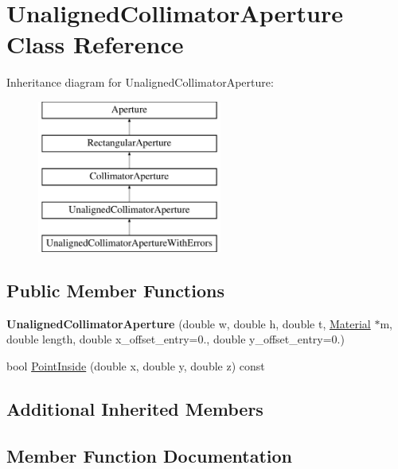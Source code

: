 \hypertarget{classUnalignedCollimatorAperture}{}\section{Unaligned\+Collimator\+Aperture Class Reference}
\label{classUnalignedCollimatorAperture}
Inheritance diagram for Unaligned\+Collimator\+Aperture\+:\begin{figure}[H]
\begin{center}
\leavevmode
\includegraphics[height=5.000000cm]{classUnalignedCollimatorAperture}
\end{center}
\end{figure}
\subsection*{Public Member Functions}
\begin{DoxyCompactItemize}
\item 
\mbox{\label{classUnalignedCollimatorAperture_a76d1e3e6e6385dc107100540514e33f9}} 
{\bfseries Unaligned\+Collimator\+Aperture} (double w, double h, double t, \hyperlink{classMaterial}{Material} $\ast$m, double length, double x\+\_\+offset\+\_\+entry=0., double y\+\_\+offset\+\_\+entry=0.)
\item 
bool \hyperlink{classUnalignedCollimatorAperture_af116c2ff1d60c4894a9b9ae4cfc2b19e}{Point\+Inside} (double x, double y, double z) const
\end{DoxyCompactItemize}
\subsection*{Additional Inherited Members}


\subsection{Member Function Documentation}
\mbox{\label{classUnalignedCollimatorAperture_af116c2ff1d60c4894a9b9ae4cfc2b19e}} 
